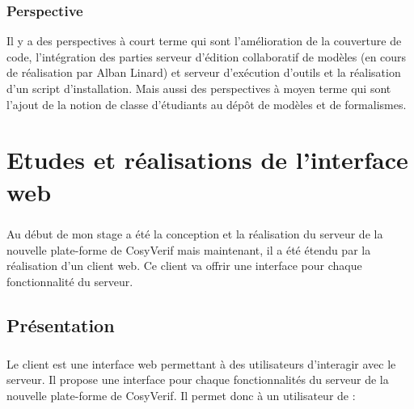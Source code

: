 \documentclass{report}
\begin{document}
\subsection{Perspective}

Il y a des perspectives à court terme qui sont l'amélioration de la couverture de code, l'intégration des parties
serveur d'édition collaboratif de modèles (en cours de réalisation par Alban Linard) et serveur d'exécution d'outils 
et la réalisation d'un script d'installation. Mais aussi des perspectives à moyen terme qui sont l'ajout de la notion de 
classe d'étudiants au dépôt de modèles et de formalismes.


\chapter{Etudes et réalisations de l'interface web}

\paragraph{}
Au début de mon stage a été la conception et la réalisation du serveur de la nouvelle plate-forme de CosyVerif mais
maintenant, il a été étendu par la réalisation d'un client web. Ce client va offrir une interface pour chaque fonctionnalité
du serveur. 

\section{Présentation}

\paragraph{}
Le client est une interface web permettant à des utilisateurs d'interagir avec le serveur. Il propose une interface pour chaque 
fonctionnalités du serveur de la nouvelle plate-forme de CosyVerif. Il permet donc à un utilisateur de :
\end{document}
